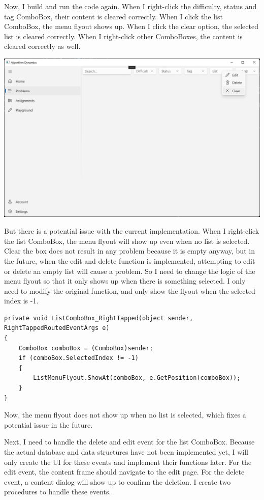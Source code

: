 \documentclass[a4paper]{report}
\begin{document}
Now, I build and run the code again. When I right-click the difficulty, status and tag ComboBox, their content is cleared correctly. When I click the list ComboBox, the menu flyout shows up. When I click the clear option, the selected list is cleared correctly. When I right-click other ComboBoxes, the content is cleared correctly as well.

\includegraphics[width=\textwidth, height=\textheight, keepaspectratio]{ProblemsPage-ListComboBox-FlyoutMenu}

But there is a potential issue with the current implementation. When I right-click the list ComboBox, the menu flyout will show up even when no list is selected. Clear the box does not result in any problem because it is empty anyway, but in the future, when the edit and delete function is implemented, attempting to edit or delete an empty list will cause a problem. So I need to change the logic of the menu flyout so that it only shows up when there is something selected. I only need to modify the original function, and only show the flyout when the selected index is -1.

\begin{verbatim}
private void ListComboBox_RightTapped(object sender, RightTappedRoutedEventArgs e)
{
    ComboBox comboBox = (ComboBox)sender;
    if (comboBox.SelectedIndex != -1)
    {
        ListMenuFlyout.ShowAt(comboBox, e.GetPosition(comboBox));
    }
}
\end{verbatim}

Now, the menu flyout does not show up when no list is selected, which fixes a potential issue in the future.

Next, I need to handle the delete and edit event for the list ComboBox. Because the actual database and data structures have not been implemented yet, I will only create the UI for these events and implement their functions later. For the edit event, the content frame should navigate to the edit page. For the delete event, a content dialog will show up to confirm the deletion. I create two procedures to handle these events.
\end{document}
